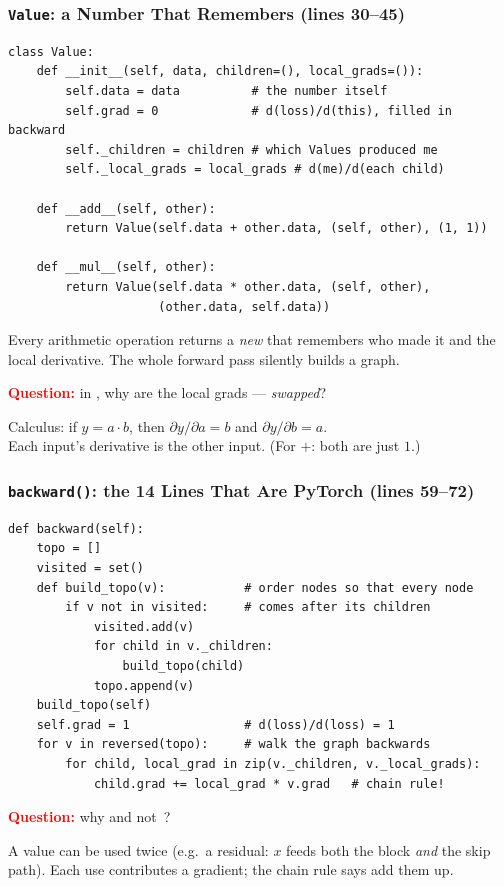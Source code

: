 \begin{frame}[fragile]
    \frametitle{\texttt{Value}: a Number That Remembers (lines 30--45)}

\begin{lstlisting}
class Value:
    def __init__(self, data, children=(), local_grads=()):
        self.data = data          # the number itself
        self.grad = 0             # d(loss)/d(this), filled in backward
        self._children = children # which Values produced me
        self._local_grads = local_grads # d(me)/d(each child)

    def __add__(self, other):
        return Value(self.data + other.data, (self, other), (1, 1))

    def __mul__(self, other):
        return Value(self.data * other.data, (self, other),
                     (other.data, self.data))
\end{lstlisting}

    Every arithmetic operation returns a \emph{new}  that remembers \alert{who made it} and \alert{the local derivative}. The whole forward pass silently builds a graph.

    \pause

    \textcolor{red}{\textbf{Question:}} in , why are the local grads  --- \emph{swapped}?

    \pause

    Calculus: if $y = a \cdot b$, then $\partial y / \partial a = b$ and $\partial y / \partial b = a$.\\
    Each input's derivative is \alert{the other input}. (For $+$: both are just $1$.)
\end{frame}

\begin{frame}[fragile]
    \frametitle{\texttt{backward()}: the 14 Lines That Are PyTorch (lines 59--72)}

\begin{lstlisting}
def backward(self):
    topo = []
    visited = set()
    def build_topo(v):           # order nodes so that every node
        if v not in visited:     # comes after its children
            visited.add(v)
            for child in v._children:
                build_topo(child)
            topo.append(v)
    build_topo(self)
    self.grad = 1                # d(loss)/d(loss) = 1
    for v in reversed(topo):     # walk the graph backwards
        for child, local_grad in zip(v._children, v._local_grads):
            child.grad += local_grad * v.grad   # chain rule!
\end{lstlisting}

    \pause

    \textcolor{red}{\textbf{Question:}} why  and not \code{=}\,?

    \pause

    A value can be \alert{used twice} (e.g.\ a residual: $x$ feeds both the block \emph{and} the skip path). Each use contributes a gradient; the chain rule says \alert{add them up}.
\end{frame}

